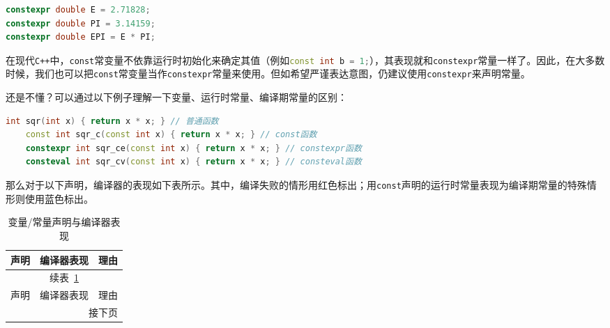 \begin{lstlisting}[language=C++]
constexpr double E = 2.71828;
constexpr double PI = 3.14159;
constexpr double EPI = E * PI;
\end{lstlisting}

在现代\texttt{C++}中，\texttt{const}常变量不依靠运行时初始化来确定其值（例如\lstinline[language=c++]|const int b = 1;|），其表现就和\texttt{constexpr}常量一样了。因此，在大多数时候，我们也可以把\texttt{const}常变量当作\texttt{constexpr}常量来使用。但如希望严谨表达意图，仍建议使用\texttt{constexpr}来声明常量。

\begin{tip}
还是不懂？可以通过以下例子理解一下变量、运行时常量、编译期常量的区别：
\begin{lstlisting}[language=C++]
    int sqr(int x) { return x * x; } // 普通函数
    const int sqr_c(const int x) { return x * x; } // const函数
    constexpr int sqr_ce(const int x) { return x * x; } // constexpr函数
    consteval int sqr_cv(const int x) { return x * x; } // consteval函数
\end{lstlisting}

那么对于以下声明，编译器的表现如下表所示。其中，编译失败的情形用红色标出；用\texttt{const}声明的运行时常量表现为编译期常量的特殊情形则使用蓝色标出。
\begin{small}            %
\begin{longtable}[c]{l|ll}
  \caption{变量/常量声明与编译器表现}
  \label{tab:long}\\
  \toprule
  声明 & 编译器表现 & 理由 \\
  \midrule
  \endfirsthead          %

  \multicolumn{3}{c}{\footnotesize 续表~\ref{tab:long}}\\[.5ex]
  \toprule
  声明 & 编译器表现 & 理由 \\
  \midrule
  \endhead               %

  \midrule
  \multicolumn{3}{r}{\footnotesize 接下页}
  \endfoot               %

  \bottomrule
  \endlastfoot           %


\end{longtable}
\end{small}
\end{tip}
